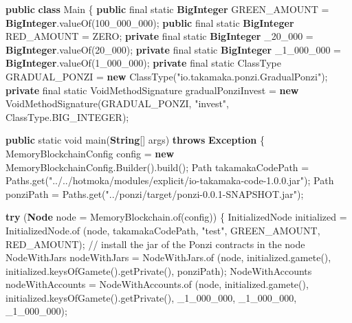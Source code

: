 \documentclass[a4paper,]{book}
\newenvironment{Shaded}{\begin{snugshade}}{\end{snugshade}}
\newcommand{\BuiltInTok}[1]{\textcolor[rgb]{0.39,0.29,0.61}{\textbf{#1}}}
\newcommand{\CommentTok}[1]{\textcolor[rgb]{0.54,0.53,0.53}{#1}}
\newcommand{\DataTypeTok}[1]{\textcolor[rgb]{0.00,0.34,0.68}{#1}}
\newcommand{\DecValTok}[1]{\textcolor[rgb]{0.69,0.50,0.00}{#1}}
\newcommand{\FunctionTok}[1]{\textcolor[rgb]{0.39,0.29,0.61}{#1}}
\newcommand{\KeywordTok}[1]{\textcolor[rgb]{0.12,0.11,0.11}{\textbf{#1}}}
\newcommand{\NormalTok}[1]{\textcolor[rgb]{0.12,0.11,0.11}{#1}}
\newcommand{\StringTok}[1]{\textcolor[rgb]{0.75,0.01,0.01}{#1}}
\renewenvironment{Shaded}{\begin{snugshade}\small}{\end{snugshade}}
\begin{document}
{\begin{Shaded}
\begin{Highlighting}[]
\KeywordTok{public} \KeywordTok{class}\NormalTok{ Main \{}
  \KeywordTok{public} \DataTypeTok{final} \DataTypeTok{static} \BuiltInTok{BigInteger}\NormalTok{ GREEN_AMOUNT = }\BuiltInTok{BigInteger}\NormalTok{.}\FunctionTok{valueOf}\NormalTok{(}\DecValTok{100_000_000}\NormalTok{);}
  \KeywordTok{public} \DataTypeTok{final} \DataTypeTok{static} \BuiltInTok{BigInteger}\NormalTok{ RED_AMOUNT = ZERO;}
  \KeywordTok{private} \DataTypeTok{final} \DataTypeTok{static} \BuiltInTok{BigInteger}\NormalTok{ _}\DecValTok{20_000}\NormalTok{ = }\BuiltInTok{BigInteger}\NormalTok{.}\FunctionTok{valueOf}\NormalTok{(}\DecValTok{20_000}\NormalTok{);}
  \KeywordTok{private} \DataTypeTok{final} \DataTypeTok{static} \BuiltInTok{BigInteger}\NormalTok{ _}\DecValTok{1_000_000}\NormalTok{ = }\BuiltInTok{BigInteger}\NormalTok{.}\FunctionTok{valueOf}\NormalTok{(}\DecValTok{1_000_000}\NormalTok{);}
  \KeywordTok{private} \DataTypeTok{final} \DataTypeTok{static}\NormalTok{ ClassType GRADUAL_PONZI}
\NormalTok{    = }\KeywordTok{new} \FunctionTok{ClassType}\NormalTok{(}\StringTok{"io.takamaka.ponzi.GradualPonzi"}\NormalTok{);}
  \KeywordTok{private} \DataTypeTok{final} \DataTypeTok{static}\NormalTok{ VoidMethodSignature gradualPonziInvest}
\NormalTok{    = }\KeywordTok{new} \FunctionTok{VoidMethodSignature}\NormalTok{(GRADUAL_PONZI, }\StringTok{"invest"}\NormalTok{, ClassType.}\FunctionTok{BIG_INTEGER}\NormalTok{);}

  \KeywordTok{public} \DataTypeTok{static} \DataTypeTok{void} \FunctionTok{main}\NormalTok{(}\BuiltInTok{String}\NormalTok{[] args) }\KeywordTok{throws} \BuiltInTok{Exception}\NormalTok{ \{}
\NormalTok{    MemoryBlockchainConfig config = }\KeywordTok{new}\NormalTok{ MemoryBlockchainConfig.}\FunctionTok{Builder}\NormalTok{().}\FunctionTok{build}\NormalTok{();}
\NormalTok{    Path takamakaCodePath = Paths.}\FunctionTok{get}\NormalTok{(}\StringTok{"../../hotmoka/modules/explicit/io-takamaka-code-1.0.0.jar"}\NormalTok{);}
\NormalTok{    Path ponziPath = Paths.}\FunctionTok{get}\NormalTok{(}\StringTok{"../ponzi/target/ponzi-0.0.1-SNAPSHOT.jar"}\NormalTok{);}

    \KeywordTok{try}\NormalTok{ (}\BuiltInTok{Node}\NormalTok{ node = MemoryBlockchain.}\FunctionTok{of}\NormalTok{(config)) \{}
\NormalTok{      InitializedNode initialized = InitializedNode.}\FunctionTok{of}
\NormalTok{        (node, takamakaCodePath, }\StringTok{"test"}\NormalTok{, GREEN_AMOUNT, RED_AMOUNT);}
      \CommentTok{// install the jar of the Ponzi contracts in the node}
\NormalTok{      NodeWithJars nodeWithJars = NodeWithJars.}\FunctionTok{of}
\NormalTok{        (node, initialized.}\FunctionTok{gamete}\NormalTok{(), initialized.}\FunctionTok{keysOfGamete}\NormalTok{().}\FunctionTok{getPrivate}\NormalTok{(),}
\NormalTok{         ponziPath);}
\NormalTok{      NodeWithAccounts nodeWithAccounts = NodeWithAccounts.}\FunctionTok{of}
\NormalTok{        (node, initialized.}\FunctionTok{gamete}\NormalTok{(), initialized.}\FunctionTok{keysOfGamete}\NormalTok{().}\FunctionTok{getPrivate}\NormalTok{(),}
\NormalTok{        _}\DecValTok{1_000_000}\NormalTok{, _}\DecValTok{1_000_000}\NormalTok{, _}\DecValTok{1_000_000}\NormalTok{);}


\end{Highlighting}
\end{Shaded}}
\end{document}
